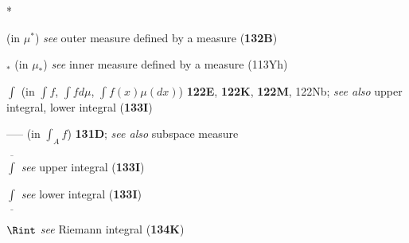 *
 
 
(in $\mu^*$) {\it see} outer measure defined by a measure ({\bf 132B})

$_*$ (in $\mu_*$) {\it see} inner measure defined by a measure
(113Yh)
















$\int$ (in $\int f$, $\int fd\mu$, $\int f(x)\mu(dx)$) {\bf 122E}, {\bf
122K}, {\bf 122M}, 122Nb; 
  {\it see also} upper integral, lower integral ({\bf 133I})



----- (in $\int_Af$) {\bf 131D};  
  {\it see also} subspace measure



$\overline{\int}$ {\it see} upper integral ({\bf 133I})

$\underline{\int}$ {\it see} lower integral ({\bf 133I})





$\Rint$ {\it see} Riemann integral ({\bf 134K})
































































